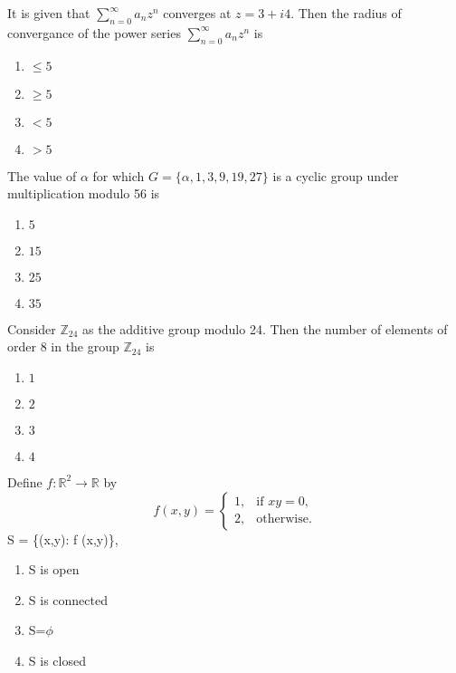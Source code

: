 \item It is given that $\sum_{n=0}^{\infty}a_n z^n$ converges at $z=3+i4$. Then the radius of convergance of the power series $\sum_{n=0}^{\infty}a_n z^n$ is 
\begin{multicols}{2}
\begin{enumerate}
    \item $\leq 5$
    \item $\geq 5$
    \item $<5$
    \item $>5$
\end{enumerate}    
\end{multicols}
\item The value of $\alpha$ for which $G=\{\alpha,1,3,9,19,27\}$ is a cyclic group under multiplication modulo 56 is 
\begin{multicols}{2}
\begin{enumerate}
    \item $5$
    \item $15$
    \item $25$
    \item $35$
\end{enumerate}    
\end{multicols}
\item Consider $\mathbb{Z}_{24}$ as the additive group modulo 24. Then the number of elements of order 8 in the group $\mathbb{Z}_{24}$ is
\begin{multicols}{2}
\begin{enumerate}
   \item $1$
    \item $2$
    \item $3$
    \item $4$
\end{enumerate}    
\end{multicols}
\item Define $f:\mathbb{R}^2\rightarrow \mathbb{R}$ by
\[
f(x,y) = \begin{cases}
1, & \text{if } xy = 0, \\
2, & \text{otherwise.}
\end{cases}
\]
 S = \{(x,y): f  (x,y)\}, 
\begin{multicols}{2}
\begin{enumerate}
    \item S is open
    \item S is connected 
    \item S=$\phi$
    \item S is closed 
\end{enumerate}    
\end{multicols}
